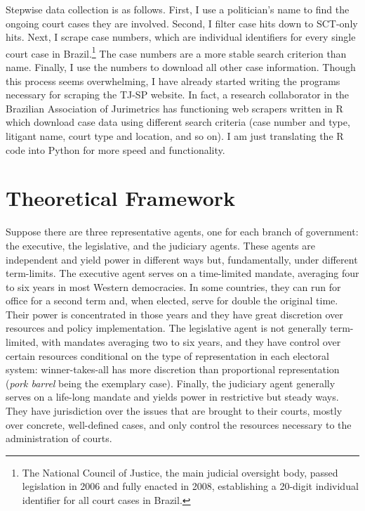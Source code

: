 \documentclass[11pt]{article}
\begin{document}
Stepwise data collection is as follows. First, I use a politician's name to find the ongoing court cases they are involved. Second, I filter case hits down to SCT-only hits. Next, I scrape case numbers, which are individual identifiers for every single court case in Brazil.\footnote{The National Council of Justice, the main judicial oversight body, passed legislation in 2006 and fully enacted in 2008, establishing a 20-digit individual identifier for all court cases in Brazil.} The case numbers are a more stable search criterion than name. Finally, I use the numbers to download all other case information. Though this process seems overwhelming, I have already started writing the programs necessary for scraping the TJ-SP website. In fact, a research collaborator in the Brazilian Association of Jurimetrics has functioning web scrapers written in R which download case data using different search criteria (case number and type, litigant name, court type and location, and so on). I am just translating the R code into Python for more speed and functionality.

\section{Theoretical Framework} \label{sec:theory_paper2}

Suppose there are three representative agents, one for each branch of government: the executive, the legislative, and the judiciary agents. These agents are independent and yield power in different ways but, fundamentally, under different term-limits. The executive agent serves on a time-limited mandate, averaging four to six years in most Western democracies. In some countries, they can run for office for a second term and, when elected, serve for double the original time. Their power is concentrated in those years and they have great discretion over resources and policy implementation. The legislative agent is not generally term-limited, with mandates averaging two to six years, and they have control over certain resources conditional on the type of representation in each electoral system: winner-takes-all has more discretion than proportional representation (\emph{pork barrel} being the exemplary case). Finally, the judiciary agent generally serves on a life-long mandate and yields power in restrictive but steady ways. They have jurisdiction over the issues that are brought to their courts, mostly over concrete, well-defined cases, and only control the resources necessary to the administration of courts.
\end{document}
